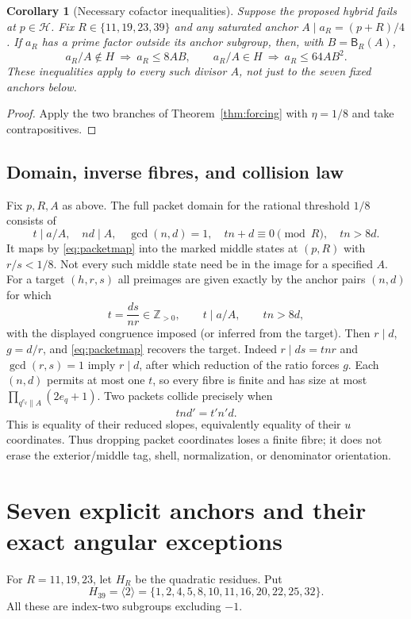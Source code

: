 \documentclass[11pt]{article}
\newtheorem{corollary}[theorem]{Corollary}
\theoremstyle{definition}\newtheorem{definition}[theorem]{Definition}
\theoremstyle{remark}\newtheorem{remark}[theorem]{Remark}
\newcommand{\HH}{\mathcal H}
\newcommand{\B}{\mathsf B}
\begin{document}
\begin{corollary}[Necessary cofactor inequalities]\label{cor:heightobstruction}
Suppose the proposed hybrid fails at $p\in\HH$. Fix $R\in\{11,19,23,39\}$ and any saturated anchor $A\mid a_R=(p+R)/4$. If $a_R$ has a prime factor outside its anchor subgroup, then, with $B=\B_R(A)$,
\[
 a_R/A\notin H\ \Longrightarrow\ a_R\le8AB,
 \qquad
 a_R/A\in H\ \Longrightarrow\ a_R\le64AB^2.
\]
These inequalities apply to every such divisor $A$, not just to the seven fixed anchors below.
\end{corollary}
\begin{proof}
Apply the two branches of Theorem~\ref{thm:forcing} with $\eta=1/8$ and take contrapositives.
\end{proof}

\subsection{Domain, inverse fibres, and collision law}
Fix $p,R,A$ as above. The full packet domain for the rational threshold $1/8$ consists of
\[
 t\mid a/A,\quad nd\mid A,\quad\gcd(n,d)=1,\quad
 tn+d\equiv0\pmod R,\quad tn>8d.
\]
It maps by \eqref{eq:packetmap} into the marked middle states at $(p,R)$ with $r/s<1/8$. Not every such middle state need be in the image for a specified $A$.
For a target $(h,r,s)$ all preimages are given exactly by the anchor pairs $(n,d)$ for which
\begin{equation}\label{eq:packetinverse}
 t=\frac{ds}{nr}\in\mathbb Z_{>0},\qquad t\mid a/A,
 \qquad tn>8d,
\end{equation}
with the displayed congruence imposed (or inferred from the target). Then $r\mid d$, $g=d/r$, and \eqref{eq:packetmap} recovers the target. Indeed $r\mid ds=tnr$ and $\gcd(r,s)=1$ imply $r\mid d$, after which reduction of the ratio forces $g$.
Each $(n,d)$ permits at most one $t$, so every fibre is finite and has size at most $\prod_{q^{e_q}\parallel A}(2e_q+1)$.
Two packets collide precisely when
\begin{equation}\label{eq:collision}
 tnd'=t'n'd.
\end{equation}
This is equality of their reduced slopes, equivalently equality of their $u$ coordinates. Thus dropping packet coordinates loses a finite fibre; it does not erase the exterior/middle tag, shell, normalization, or denominator orientation.

\section{Seven explicit anchors and their exact angular exceptions}\label{sec:anchors}
For $R=11,19,23$, let $H_R$ be the quadratic residues. Put
\[
 H_{39}=\langle2\rangle=\{1,2,4,5,8,10,11,16,20,22,25,32\}.
\]
All these are index-two subgroups excluding $-1$.
\end{document}
